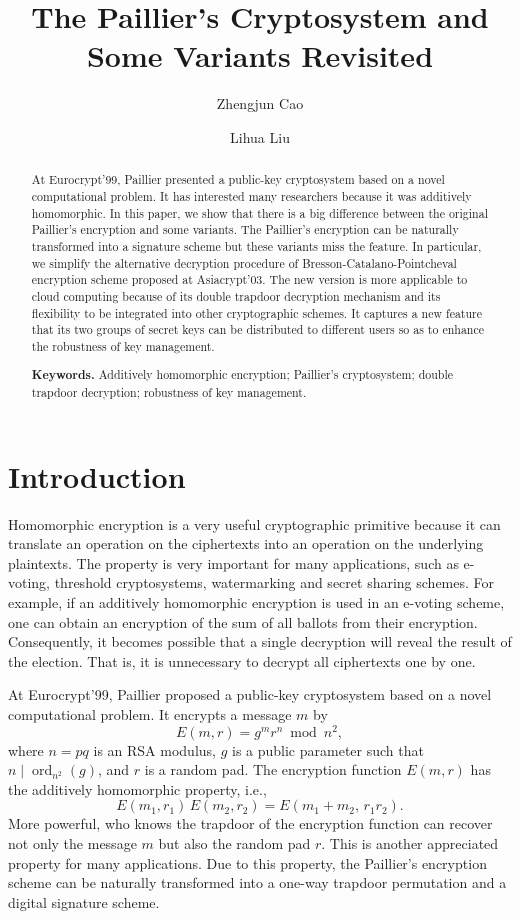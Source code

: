 \documentclass[11pt,a4paper]{article}
\title{The Paillier's Cryptosystem and Some Variants Revisited}
\author{Zhengjun Cao \and Lihua Liu}
\date{}
\theoremstyle{remark}
\newcommand{\ord}{\operatorname{ord}}
\begin{document}
\maketitle

\begin{abstract}
\noindent
At Eurocrypt'99, Paillier presented a public-key cryptosystem based on a novel computational problem. It has interested many researchers because it was additively homomorphic. In this paper, we show that there is a big difference between the original Paillier's encryption and some variants. The Paillier's encryption can be naturally transformed into a signature scheme but these variants miss the feature. In particular, we simplify the alternative decryption procedure of Bresson-Catalano-Pointcheval encryption scheme proposed at Asiacrypt'03. The new version is more applicable to cloud computing because of its double trapdoor decryption mechanism and its flexibility to be integrated into other cryptographic schemes. It captures a new feature that its two groups of secret keys can be distributed to different users so as to enhance the robustness of key management.

\medskip
\noindent\textbf{Keywords.} Additively homomorphic encryption; Paillier's cryptosystem; double trapdoor decryption; robustness of key management.
\end{abstract}

\section{Introduction}

Homomorphic encryption is a very useful cryptographic primitive because it can translate an operation on the ciphertexts into an operation on the underlying plaintexts. The property is very important for many applications, such as e-voting, threshold cryptosystems, watermarking and secret sharing schemes. For example, if an additively homomorphic encryption is used in an e-voting scheme, one can obtain an encryption of the sum of all ballots from their encryption. Consequently, it becomes possible that a single decryption will reveal the result of the election. That is, it is unnecessary to decrypt all ciphertexts one by one.

At Eurocrypt'99, Paillier \cite{Pai99} proposed a public-key cryptosystem based on a novel computational problem. It encrypts a message $m$ by
\[
E(m,r) = g^m r^n \bmod n^2,
\]
where $n=pq$ is an RSA modulus, $g$ is a public parameter such that $n \mid \ord_{n^2}(g)$, and $r$ is a random pad. The encryption function $E(m,r)$ has the additively homomorphic property, i.e.,
\[
E(m_1,r_1)\,E(m_2,r_2) = E(m_1+m_2,\, r_1 r_2).
\]
More powerful, who knows the trapdoor of the encryption function can recover not only the message $m$ but also the random pad $r$. This is another appreciated property for many applications. Due to this property, the Paillier's encryption scheme can be naturally transformed into a one-way trapdoor permutation and a digital signature scheme.
\end{document}
